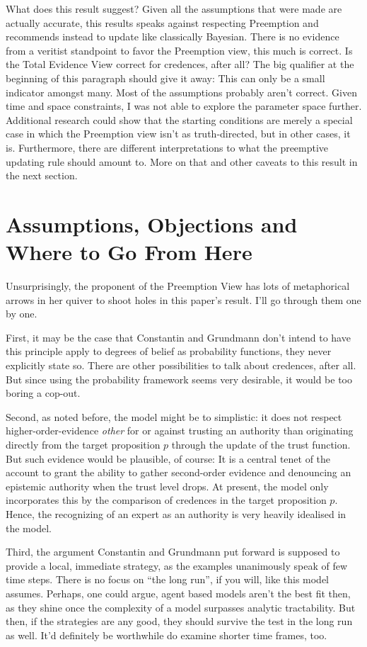 \documentclass[11pt, a4paper]{scrartcl}
\renewcommand{\i}[1]{\emph{#1}}
\begin{document}
What does this result suggest? Given all the assumptions that were made are actually accurate, this results speaks against respecting Preemption and recommends instead to update like classically Bayesian. There is no evidence from a veritist standpoint to favor the Preemption view, this much is correct. Is the Total Evidence View correct for credences, after all? The big qualifier at the beginning of this paragraph should give it away: This can only be a small indicator amongst many. Most of the assumptions probably aren't correct. Given time and space constraints, I was not able to explore the parameter space further. Additional research could show that the starting conditions are merely a special case in which the Preemption view isn't as truth-directed, but in other cases, it is. Furthermore, there are different interpretations to what the preemptive updating rule should amount to. More on that and other caveats to this result in the next section.
\newpage
\section{Assumptions, Objections and Where to Go From Here}

Unsurprisingly, the proponent of the Preemption View has lots of metaphorical arrows in her quiver to shoot holes in this paper's result. I'll go through them one by one.

First, it may be the case that Constantin and Grundmann don't intend to have this principle apply to degrees of belief as probability functions, they never explicitly state so. There are other possibilities to talk about credences, after all. But since using the probability framework seems very desirable, it would be too boring a cop-out.

Second, as noted before, the model might be to simplistic: it does not respect higher-order-evidence \i{other} for or against trusting an authority than originating directly from the target proposition $p$ through the update of the trust function. But such evidence would be plausible, of course: It is a central tenet of the account to grant the ability to gather second-order evidence and denouncing an epistemic authority when the trust level drops. At present, the model only incorporates this by the comparison of credences in the target proposition $p$. Hence, the recognizing of an expert as an authority is very heavily idealised in the model.

Third, the argument Constantin and Grundmann put forward is supposed to provide a local, immediate strategy, as the examples unanimously speak of few time steps. There is no focus on ``the long run'', if you will, like this model assumes. Perhaps, one could argue, agent based models aren't the best fit then, as they shine once the complexity of a model surpasses analytic tractability. But then, if the strategies are any good, they should survive the test in the long run as well. It'd definitely be worthwhile do examine shorter time frames, too.   
\end{document}
